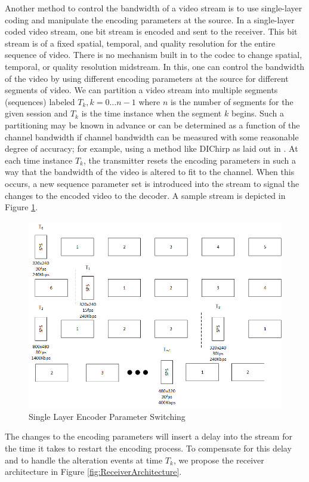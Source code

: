\documentclass[preprint, 12pt]{elsarticle}
\begin{document}
Another method to control the bandwidth of a video stream is to use single-layer coding and manipulate the encoding parameters at the source. In a single-layer coded video stream, one bit stream is encoded and sent to the receiver. This bit stream is of a fixed spatial, temporal, and quality resolution for the entire sequence of video. There is no mechanism built in to the codec to change spatial, temporal, or quality resolution midstream. In this, one can control the bandwidth of the video by using different encoding parameters at the source for different segments of video. We can partition a video stream into multiple segments (sequences) labeled $T_k,k=0\ldots{n-1}$ where $n$ is the number of segments for the given session and $T_k$ is the time instance when the segment $k$ begins. Such a partitioning may be known in advance or can be determined as a function of the channel bandwidth if channel bandwidth can be measured with some reasonable degree of accuracy; for example, using a method like DIChirp as laid out in \cite{DIChirp}. At each time instance $T_k$, the transmitter resets the encoding parameters in such a way that the bandwidth of the video is altered to fit to the channel. When this occurs, a new sequence parameter set is introduced into the stream to signal the changes to the encoded video to the decoder. A sample stream is depicted in Figure \ref{fig:SingleLayerSwitching}.
\begin{figure}[h]
\centering
\includegraphics[width=0.8\linewidth]{SingleLayerParameterSwitching.png}
\caption{Single Layer Encoder Parameter Switching}
\label{fig:SingleLayerSwitching}
\end{figure}
The changes to the encoding parameters will insert a delay into the stream for the time it takes to restart the encoding process. To compensate for this delay and to handle the alteration events at time $T_k$, we propose the receiver architecture in Figure \ref{fig:ReceiverArchitecture}.
\end{document}
